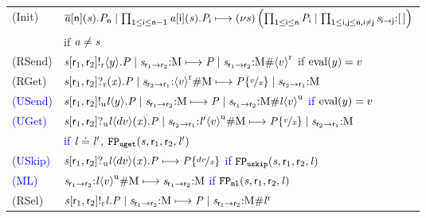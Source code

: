 \begin{figure}[tp]
	\renewcommand{\tabcolsep}{2pt}
	\begin{tabular}{ll}
		(\textsf{Init}) & $ \PReq{\Chan[a]}{\Role[n]}{\Chan}{\PT_{\Role[n]}} \mid \prod_{1 \leq \Role[i] \leq \Role[n] - 1} \PAcc{\Chan[a]}{\Role[i]}{\Chan}{\PT_{\Role[i]}} \step \PRes{\Chan}{\left( \prod_{1 \leq \Role[i] \leq \Role[n]} \PT_{\Role[i]} \mid \prod_{1 \leq \Role[i], \Role[j] \leq \Role[n], \Role[i] \neq \Role[j]} \MQ{\Chan}{\Role[i]}{\Role[j]}{\emptyList} \right)} $\\
		& \hfill if $ \Chan[a] \neq \Chan $\\
		(\textsf{RSend}) & $ \PSendR{\Chan}{\Role_1}{\Role_2}{\Expr[y]}{\PT} \mid \MQ{\Chan}{\Role_1}{\Role_2}{\Queue} \step \PT \mid \MQ{\Chan}{\Role_1}{\Role_2}{\Queue\#\MessR{\Expr[v]}} $ \hfill if $ \Eval{\Expr[y]} = \Expr[v] $\\
		(\textsf{RGet}) & $ \PGetR{\Chan}{\Role_1}{\Role_2}{\Args}{\PT} \mid \MQ{\Chan}{\Role_2}{\Role_1}{\MessR{\Expr[v]}\#\Queue} \step \PT\Subst{\Expr[v]}{\Args} \mid \MQ{\Chan}{\Role_2}{\Role_1}{\Queue} $\\
		\textcolor{blue}{(\textsf{USend})} & \textcolor{blue}{$ \PSendU{\Chan}{\Role_1}{\Role_2}{\Label}{\Expr[y]}{\PT} \mid \MQ{\Chan}{\Role_1}{\Role_2}{\Queue} \step \PT \mid \MQ{\Chan}{\Role_1}{\Role_2}{\Queue\#\MessU{\Label}{\Expr[v]}} $ \hfill if $ \Eval{\Expr[y]} = \Expr[v] $}\\
		\textcolor{blue}{(\textsf{UGet})} & \textcolor{blue}{$ \PGetU{\Chan}{\Role_1}{\Role_2}{\Label}{\Expr[dv]}{\Args}{\PT} \mid \MQ{\Chan}{\Role_2}{\Role_1}{\MessU{\Label'}{\Expr[v]}\#\Queue} \step \PT\Subst{\Expr[v]}{\Args} \mid \MQ{\Chan}{\Role_2}{\Role_1}{\Queue} $}\\
		& \hfill \textcolor{blue}{if $ \Label \compL \Label' $, $ \fpUGet(\Chan, \Role_1, \Role_2, \Label') $}\\
		\textcolor{blue}{(\textsf{USkip})} & \textcolor{blue}{$ \PGetU{\Chan}{\Role_1}{\Role_2}{\Label}{\Expr[dv]}{\Args}{\PT} \step \PT\Subst{\Expr[dv]}{\Args} $ \hfill if $ \fpUSkip(\Chan, \Role_1, \Role_2, \Label) $}\\
		\textcolor{blue}{(\textsf{ML})} & \textcolor{blue}{$ \MQ{\Chan}{\Role_1}{\Role_2}{\MessU{\Label}{\Expr[v]}\#\Queue} \step \MQ{\Chan}{\Role_1}{\Role_2}{\Queue} $ \hfill if $ \fpML(\Chan, \Role_1, \Role_2, \Label) $}\\
		(\textsf{RSel}) & $ \PSelR{\Chan}{\Role_1}{\Role_2}{\Label}{\PT} \mid \MQ{\Chan}{\Role_1}{\Role_2}{\Queue} \step \PT \mid \MQ{\Chan}{\Role_1}{\Role_2}{\Queue\#\MessBR{\Label}} $\\

\end{tabular}
\end{figure}
